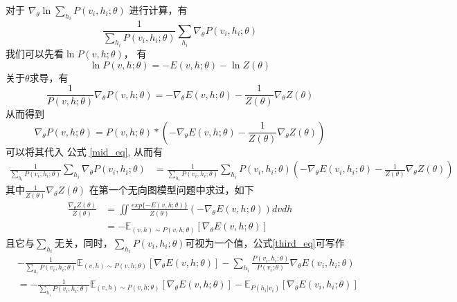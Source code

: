 \documentclass[UTF8]{ctexart}
\numberwithin{equation}{section}
\begin{document}
对于 $\nabla_\theta \ln \sum_{h_i} P(v_i, h_i; \theta)$ 进行计算，有
\begin{equation}
    \frac{1}{\sum_{h_i} P(v_i, h_i; \theta)} \sum_{h_i} \nabla_\theta P(v_i, h_i; \theta) \label{mid_eq}
\end{equation}
我们可以先看$\ln P(v,h; \theta)$， 有
\begin{equation*}
    \ln P(v,h; \theta) = -E(v,h;\theta) - \ln Z(\theta)
\end{equation*}
关于$\theta$求导，有
\begin{equation*}
    \frac{1}{P(v, h; \theta)}  \nabla_\theta P(v, h; \theta) = -\nabla_{\theta} E(v,h;\theta) - \frac{1}{Z(\theta)}\nabla_\theta Z(\theta)
\end{equation*}
从而得到
\begin{equation*}
    \nabla_\theta P(v, h; \theta) = P(v, h; \theta) * (-\nabla_{\theta} E(v,h;\theta) - \frac{1}{Z(\theta)}\nabla_\theta Z(\theta))
\end{equation*}
可以将其代入 公式 \ref{mid_eq}, 从而有
\begin{equation}
    \begin{aligned}
        \frac{1}{\sum_{h_i} P(v_i, h_i; \theta)} \sum_{h_i} \nabla_\theta P(v_i, h_i; \theta)
        &= \frac{1}{\sum_{h_i} P(v_i, h_i; \theta)} \sum_{h_i} P(v_i, h_i; \theta)(-\nabla_{\theta} E(v_i,h_i;\theta) - \frac{1}{Z(\theta)}\nabla_\theta Z(\theta))
    \end{aligned}
    \label{third_eq}
\end{equation}
其中$\frac{1}{Z(\theta)}\nabla_\theta Z(\theta)$ 在第一个无向图模型问题中求过，如下
\begin{equation*}
    \begin{aligned}
        \frac{\nabla_\theta Z(\theta)}{Z(\theta)} 
        &= \iint \frac{exp\{-E(v,h;\theta)\}}{Z(\theta)}(-\nabla_\theta E(v,h;\theta)) dv dh   \\
        &= -\mathbb{E}_{(v,h)\sim P(v,h;\theta)}[\nabla_\theta E(v,h;\theta)]
    \end{aligned}
\end{equation*}
且它与$\sum_{h_i}$无关，同时，$\sum_{h_i}P(v_i,h_i;\theta)$可视为一个值，公式\ref{third_eq}可写作
\begin{equation}
    \begin{aligned}
    &- \frac{1}{\sum_{h_i}P(v_i, h_i;\theta)}\mathbb{E}_{(v,h)\sim P(v,h;\theta)}[\nabla_\theta E(v,h;\theta)]-\sum_{h_i}\frac{P(v_i, h_i;\theta)}{P(v_i; \theta)}\nabla_{\theta} E(v_i,h_i;\theta) \\
    &= - \frac{1}{\sum_{h_i}P(v_i, h_i;\theta)}\mathbb{E}_{(v,h)\sim P(v,h;\theta)}[\nabla_\theta E(v,h;\theta)] - \mathbb{E}_{P(h_i|v_i)}[\nabla_{\theta} E(v_i,h_i;\theta)] \\
    \end{aligned}
\end{equation}
\end{document}
